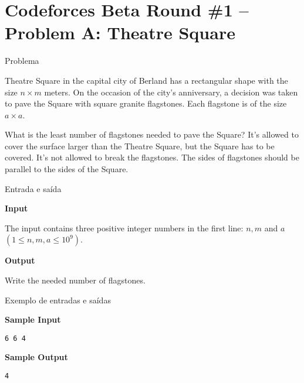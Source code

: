 \section{Codeforces Beta Round \#1 -- Problem A: Theatre Square}

\begin{frame}[fragile]{Problema}

Theatre Square in the capital city of Berland has a rectangular shape with the size 
$n\times m$ meters. On the occasion of the city's anniversary, a decision was taken to pave the 
Square with square granite flagstones. Each flagstone is of the size $a\times a$.

What is the least number of flagstones needed to pave the Square? It's allowed to cover the surface larger than the Theatre Square, but the Square has to be covered. It's not allowed to break the flagstones. The sides of flagstones should be parallel to the sides of the Square.

\end{frame}

\begin{frame}[fragile]{Entrada e saída}

\textbf{Input}

The input contains three positive integer numbers in the first line: $n, m$ and $a$ 
$(1\leq n, m, a\leq 10^9)$.

\textbf{Output}

Write the needed number of flagstones.

\end{frame}

\begin{frame}[fragile]{Exemplo de entradas e saídas}

\begin{minipage}[t]{0.65\textwidth}
\textbf{Sample Input}
\begin{verbatim}
6 6 4
\end{verbatim}
\end{minipage}
\begin{minipage}[t]{0.3\textwidth}
\textbf{Sample Output}
\begin{verbatim}
4
\end{verbatim}
\end{minipage}
\end{frame}

